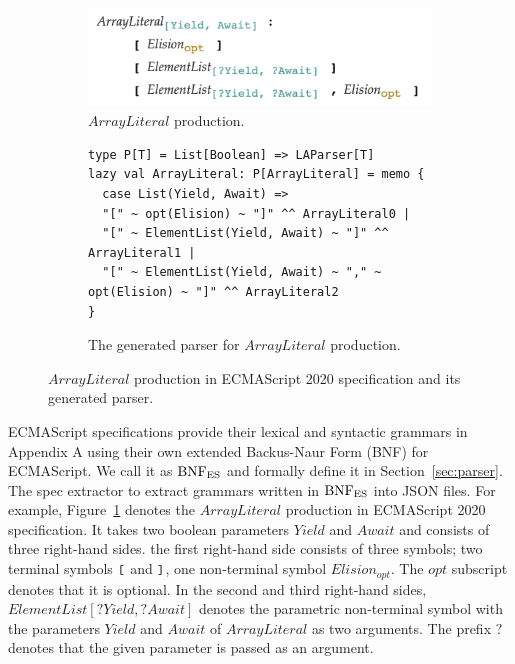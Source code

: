 \begin{figure}
  \centering
  \begin{subfigure}[t]{0.4\textwidth}
    \includegraphics[width=\textwidth]{img/array_literal.png}
    \caption{\( ArrayLiteral \) production.}
    \label{fig:array-literal-es}
  \end{subfigure}
  \begin{subfigure}[t]{0.48\textwidth}
    \begin{lstlisting}[style=myScalastyle]
type P[T] = List[Boolean] => LAParser[T]
lazy val ArrayLiteral: P[ArrayLiteral] = memo {
  case List(Yield, Await) =>
  "[" ~ opt(Elision) ~ "]" ^^ ArrayLiteral0 |
  "[" ~ ElementList(Yield, Await) ~ "]" ^^ ArrayLiteral1 |
  "[" ~ ElementList(Yield, Await) ~ "," ~ opt(Elision) ~ "]" ^^ ArrayLiteral2
}
    \end{lstlisting}
    \caption{The generated parser for \( ArrayLiteral \) production.}
    \label{fig:array-literal-parser}
  \end{subfigure}
  \caption{\( ArrayLiteral \) production in ECMAScript 2020 specification and its generated parser.}
  \label{fig:array-literal}
\end{figure}

ECMAScript specifications provide their lexical and syntactic grammars in Appendix A
using their own extended Backus-Naur Form (BNF) for ECMAScript.
We call it as \( \text{BNF}_{\text{ES}} \) and formally define it in Section~\ref{sec:parser}.
The spec extractor to extract grammars written in \( \text{BNF}_{\text{ES}} \) into JSON files.
For example, Figure~\ref{fig:array-literal-es} denotes the \( ArrayLiteral \) production
in ECMAScript 2020 specification. It takes two boolean parameters
\( Yield \) and \( Await \) and consists of three right-hand sides.
the first right-hand side consists of three symbols; two terminal symbols \( \texttt{\small[} \) and
\( \texttt{\small]} \), one non-terminal symbol \( Elision_{opt} \). The \( opt \)
subscript denotes that it is optional. In the second and third right-hand sides,
\( ElementList[?Yield, ?Await] \) denotes the parametric non-terminal symbol
with the parameters \( Yield \) and \( Await \) of \( ArrayLiteral \) as two arguments.
The prefix \( ? \) denotes that the given parameter is passed as an argument.

